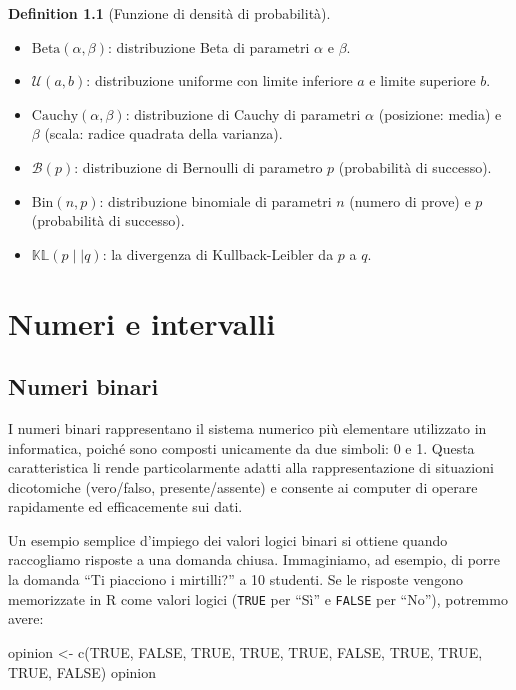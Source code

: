 \documentclass[
  letterpaper,
  DIV=11,
  numbers=noendperiod,
  oneside]{scrreprt}
\newenvironment{Shaded}{\begin{snugshade}}{\end{snugshade}}
\newcommand{\ConstantTok}[1]{\textcolor[rgb]{0.56,0.35,0.01}{#1}}
\newcommand{\FunctionTok}[1]{\textcolor[rgb]{0.28,0.35,0.67}{#1}}
\newcommand{\NormalTok}[1]{\textcolor[rgb]{0.00,0.23,0.31}{#1}}
\newcommand{\OtherTok}[1]{\textcolor[rgb]{0.00,0.23,0.31}{#1}}
\theoremstyle{definition}
\theoremstyle{plain}
\theoremstyle{definition}
\newtheorem{definition}{Definition}[chapter]
\theoremstyle{remark}
\begin{document}
\begin{definition}[Funzione di densità di
probabilità]
\begin{itemize}
  \(\mathcal{N}(\mu, \sigma^2)\): distribuzione gaussiana di media
  \(\mu\) e varianza \(sigma^2\).
\item
  \(\mbox{Beta}(\alpha, \beta)\): distribuzione Beta di parametri
  \(\alpha\) e \(\beta\).
\item
  \(\mathcal{U}(a, b)\): distribuzione uniforme con limite inferiore
  \(a\) e limite superiore \(b\).
\item
  \(\mbox{Cauchy}(\alpha, \beta)\): distribuzione di Cauchy di parametri
  \(\alpha\) (posizione: media) e \(\beta\) (scala: radice quadrata
  della varianza).
\item
  \(\mathcal{B}(p)\): distribuzione di Bernoulli di parametro \(p\)
  (probabilità di successo).
\item
  \(\mbox{Bin}(n, p)\): distribuzione binomiale di parametri \(n\)
  (numero di prove) e \(p\) (probabilità di successo).
\item
  \(\mathbb{KL} (p \mid\mid q)\): la divergenza di Kullback-Leibler da
  \(p\) a \(q\).
\end{itemize}

\chapter{Numeri e intervalli}\label{sec-apx-numbers}

\section{Numeri binari}\label{numeri-binari}

I numeri binari rappresentano il sistema numerico più elementare
utilizzato in informatica, poiché sono composti unicamente da due
simboli: 0 e 1. Questa caratteristica li rende particolarmente adatti
alla rappresentazione di situazioni dicotomiche (vero/falso,
presente/assente) e consente ai computer di operare rapidamente ed
efficacemente sui dati.

Un esempio semplice d'impiego dei valori logici binari si ottiene quando
raccogliamo risposte a una domanda chiusa. Immaginiamo, ad esempio, di
porre la domanda ``Ti piacciono i mirtilli?'' a 10 studenti. Se le
risposte vengono memorizzate in R come valori logici (\texttt{TRUE} per
``Sì'' e \texttt{FALSE} per ``No''), potremmo avere:

\begin{Shaded}
\begin{Highlighting}[]
\NormalTok{opinion }\OtherTok{\textless{}{-}} \FunctionTok{c}\NormalTok{(}\ConstantTok{TRUE}\NormalTok{, }\ConstantTok{FALSE}\NormalTok{, }\ConstantTok{TRUE}\NormalTok{, }\ConstantTok{TRUE}\NormalTok{, }\ConstantTok{TRUE}\NormalTok{, }\ConstantTok{FALSE}\NormalTok{, }\ConstantTok{TRUE}\NormalTok{, }\ConstantTok{TRUE}\NormalTok{, }\ConstantTok{TRUE}\NormalTok{, }\ConstantTok{FALSE}\NormalTok{)}
\NormalTok{opinion}
\end{Highlighting}
\end{Shaded}


\end{definition}
\end{document}
